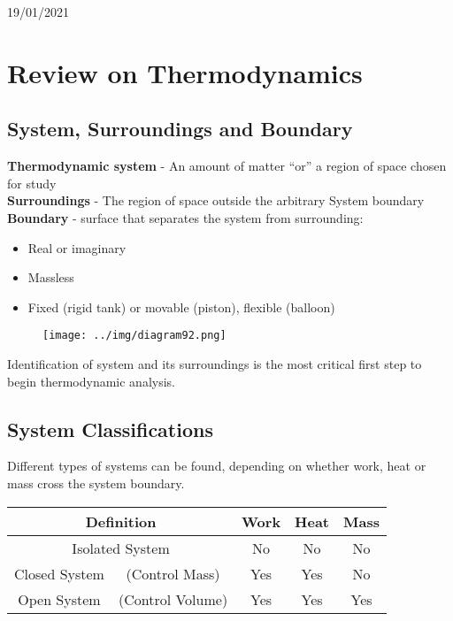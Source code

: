 \documentclass[class=report, crop=false, 12pt,a4paper]{standalone}
\numberwithin{equation}{section}
\begin{document}
\begin{center}
    19/01/2021
\end{center}
\section{Review on Thermodynamics}
\subsection{System, Surroundings and Boundary}
\textbf{Thermodynamic system} - An amount of matter “or” a region of space chosen for study \\
\textbf{Surroundings} - The region of space outside the arbitrary System boundary \\
\textbf{Boundary} - surface that separates the system from surrounding:
\begin{itemize}[noitemsep]
  \item Real or imaginary
  \item Massless
  \item Fixed (rigid tank) or movable (piston), flexible (balloon)
\end{itemize}
\begin{figure}[H]
  \centering
  \texttt{[image: ../img/diagram92.png]}
  \caption{}
\end{figure}
Identification of system and its surroundings is the most critical first step to begin thermodynamic analysis.
\subsection{System Classifications}
Different types of systems can be found, depending on whether work, heat or mass cross the system boundary.
\begin{table}[H]
  \centering
  \begin{tabular}{|c|c|c|c|c|}
  \hline
  \multicolumn{2}{|c|}{\textbf{Definition}} & \textbf{Work} & \textbf{Heat} & \textbf{Mass} \\ \hline
  \multicolumn{2}{|c|}{Isolated System}     & No            & No            & No            \\ \hline
  Closed System      & (Control Mass)       & Yes           & Yes           & No            \\ \hline
  Open System        & (Control Volume)     & Yes           & Yes           & Yes           \\ \hline
  \end{tabular}
\end{table}
\end{document}
